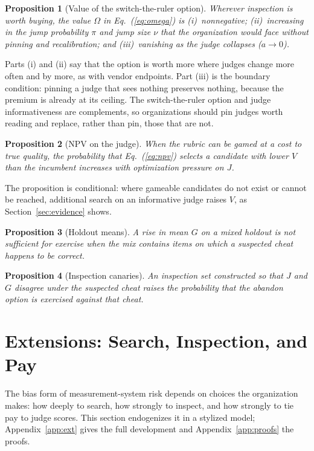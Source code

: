 \documentclass[acmsmall,screen,review,anonymous]{acmart}
\newtheorem{proposition}{Proposition}
\theoremstyle{acmdefinition}
\begin{document}
\begin{proposition}[Value of the switch-the-ruler option]
Wherever inspection is worth buying, the value $\Omega$ in Eq.~(\ref{eq:omega}) is (i)~nonnegative; (ii)~increasing in the jump probability $\pi$ and jump size $\nu$ that the organization would face without pinning and recalibration; and (iii)~vanishing as the judge collapses ($a \to 0$).
\end{proposition}

Parts (i) and (ii) say that the option is worth more where judges change more often and by more, as with vendor endpoints. Part (iii) is the boundary condition: pinning a judge that sees nothing preserves nothing, because the premium is already at its ceiling. The switch-the-ruler option and judge informativeness are complements, so organizations should pin judges worth reading and replace, rather than pin, those that are not.

\begin{proposition}[NPV on the judge]
When the rubric can be gamed at a cost to true quality, the probability that Eq.~(\ref{eq:npv}) selects a candidate with lower $V$ than the incumbent increases with optimization pressure on $J$.
\end{proposition}

The proposition is conditional: where gameable candidates do not exist or cannot be reached, additional search on an informative judge raises $V$, as Section~\ref{sec:evidence} shows.

\begin{proposition}[Holdout means]
A rise in mean $G$ on a mixed holdout is not sufficient for exercise when the mix contains items on which a suspected cheat happens to be correct.
\end{proposition}

\begin{proposition}[Inspection canaries]
An inspection set constructed so that $J$ and $G$ disagree under the suspected cheat raises the probability that the abandon option is exercised against that cheat.
\end{proposition}

\section{Extensions: Search, Inspection, and Pay}\label{sec:ext}

The bias form of measurement-system risk depends on choices the organization makes: how deeply to search, how strongly to inspect, and how strongly to tie pay to judge scores. This section endogenizes it in a stylized model; Appendix~\ref{app:ext} gives the full development and Appendix~\ref{app:proofs} the proofs.
\end{document}
